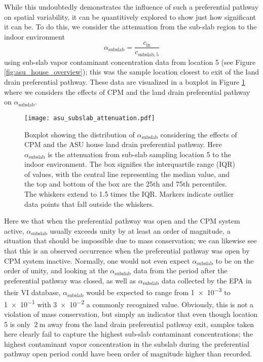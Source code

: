 While this undoubtedly demonstrates the influence of such a preferential pathway on spatial variability, it can be quantitively explored to show just how significant it can be.
To do this, we consider the attenuation from the sub-slab region to the indoor environment
\begin{equation}
  \alpha_\mathrm{subslab} = \frac{c_\mathrm{in}}{c_\mathrm{subslab,5}}
\end{equation}
using sub-slab vapor contaminant concentration data from location 5 (see Figure \ref{fig:asu_house_overview}); this was the sample location closest to exit of the land drain preferential pathway.
These data are visualized in a boxplot in Figure \ref{fig:asu_subslab_attenuation} where we considers the effects of CPM and the land drain preferential pathway on $\alpha_\mathrm{subslab}$.\par

\begin{figure}[htb!]
  \centering
  \texttt{[image: asu\_subslab\_attenuation.pdf]}
  \caption{Boxplot showing the distribution of $\alpha_\mathrm{subslab}$ considering the effects of CPM and the ASU house land drain preferential pathway. Here $\alpha_\mathrm{subslab}$ is the attenuation from sub-slab sampling location 5 to the indoor environment. The box signifies the interquartile range (IQR) of values, with the central line representing the median value, and the top and bottom of the box are the 25th and 75th percentiles. The whiskers extend to 1.5 times the IQR. Markers indicate outlier data points that fall outside the whiskers.}
  \label{fig:asu_subslab_attenuation}
\end{figure}

Here we that when the preferential pathway was open and the CPM system active, $\alpha_\mathrm{subslab}$ usually exceeds unity by at least an order of magnitude, a situation that should be impossible due to mass conservation; we can likewise see that this is an observed occurrence when the preferential pathway was open by CPM system inactive.
Normally, one would not even expect $\alpha_\mathrm{subslab}$ to be on the order of unity, and looking at the $\alpha_\mathrm{subslab}$ data from the period after the preferential pathway was closed, as well as $\alpha_\mathrm{subslab}$ data collected by the EPA in their VI database, $\alpha_\mathrm{subslab}$ would be expected to range from \num{1e-3} to \num{1e-1} with \num{3e-2} a commonly recognized value\cite{u.s._environmental_protection_agency_oswer_2015}.
Obviously, this is not a violation of mass conservation, but simply an indicator that even though location 5 is only $~\SI{2}{\metre}$ away from the land drain preferential pathway exit, samples taken here clearly fail to capture the highest sub-slab contaminant concentrations; the highest contaminant vapor concentration in the subslab during the preferential pathway open period could  have been order of magnitude higher than recorded.\par

